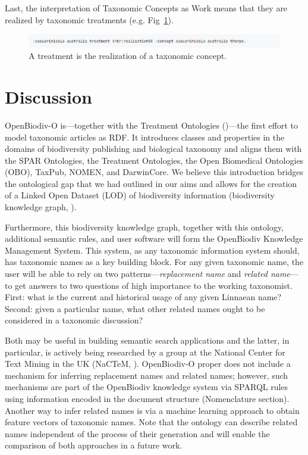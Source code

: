 Last, the interpretation of Taxonomic Concepts as Work means that they are realized by taxonomic treatments (e.g. Fig~\ref{example-treatment-concept}).

\begin{figure}[h!]
\centering
  \includegraphics[width=\textwidth]{Figures/example-treatment-concept}
  \decoRule
  \caption[Example connection between a treatment and a taxonomic concept.]{A treatment is the realization of a taxonomic concept.}
  \label{example-treatment-concept}
\end{figure}

\section{Discussion}

\mbox{OpenBiodiv-O} is---together with the Treatment Ontologies (\cite{catapano_treatment_2016})---the first effort to model taxonomic articles as RDF. It introduces classes and properties in the domains of biodiversity publishing and biological taxonomy and aligns them with the SPAR Ontologies, the Treatment Ontologies, the Open Biomedical Ontologies (OBO), TaxPub, NOMEN, and DarwinCore. We believe this introduction bridges the ontological gap that we had outlined in our aims and allows for the creation of a Linked Open Dataset (LOD) of biodiversity information (biodiversity knowledge graph, \cite{senderov_open_2016, page_towards_2016}).

Furthermore, this biodiversity knowledge graph, together with this ontology, additional semantic rules, and user software will form the OpenBiodiv Knowledge Management System. This system, as any taxonomic information system should, has taxonomic names as a key building block. For any given taxonomic name, the user will be able to rely on two patterns---\emph{replacement name} and \emph{related name}---to get answers to two questions of high importance to the working taxonomist. First: what is the current and historical usage of any given Linnaean name? Second: given a particular name, what other related names ought to be considered in a taxonomic discussion?

Both may be useful in building semantic search applications and the latter, in particular, is actively being researched by a group at the National Center for Text Mining in the UK (NaCTeM, \cite{nguyen_constructing_2017}). \mbox{OpenBiodiv-O} proper does not include a mechanism for inferring replacement names and related names; however, such mechanisms are part of the OpenBiodiv knowledge system via SPARQL rules using information encoded in the document structure (Nomenclature section). Another way to infer related names is via a machine learning approach to obtain feature vectors of taxonomic names.  Note that the ontology can describe related names independent of the process of their generation and will enable the comparison of both approaches in a future work.

